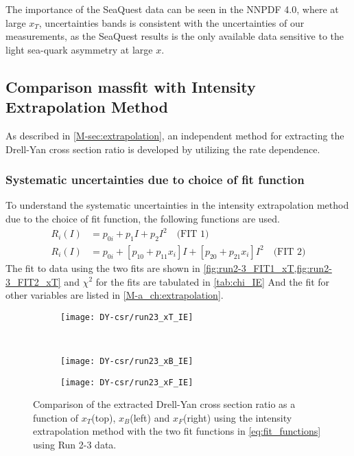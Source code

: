 \documentclass[../main.tex]{subfiles}
\begin{document}
The importance of the SeaQuest data can be seen in the NNPDF 4.0, where at large $x_T$,
uncertainties bands is consistent with the uncertainties of our measurements, as the SeaQuest
results is the only available data sensitive to the light sea-quark asymmetry at large $x$.


\subsection{Comparison massfit with Intensity Extrapolation Method}
As described in \cref{M-sec:extrapolation}, an independent method for extracting the Drell-Yan cross section
ratio is developed by utilizing the rate dependence. 

\subsubsection{Systematic uncertainties due to choice of fit function}
To understand the systematic uncertainties in the intensity extrapolation method due to the
choice of fit function, the following functions are used.
\begin{align}
	R_i\left(I\right) & = p_{0i} + p_{1} I + p_{2} I^2 \quad\text{(FIT 1)}                                                     \\
	R_i\left(I\right) & = p_{0i} + \left[p_{10} + p_{11}x_i\right] I + \left[p_{20} + p_{21}x_i\right]I^2 \quad \text{(FIT 2)}
	\label{eq:fit_functions}
\end{align}
The fit to data using the two fits are shown in \cref{fig:run2-3_FIT1_xT,fig:run2-3_FIT2_xT}
and $\chi^2$ for the fits are tabulated in \cref{tab:chi_IE}
And the fit for other variables are listed in \cref{M-a_ch:extrapolation}.



\begin{figure}[h!]
	\centering
	\begin{subfigure}{0.6\linewidth}
		\texttt{[image: DY-csr/run23\_xT\_IE]}
	\end{subfigure}\\
	\begin{subfigure}{0.45\linewidth}
		\texttt{[image: DY-csr/run23\_xB\_IE]}
	\end{subfigure}
	\begin{subfigure}{0.45\linewidth}
		\texttt{[image: DY-csr/run23\_xF\_IE]}
	\end{subfigure}
	\caption{Comparison of the extracted Drell-Yan cross section ratio as a function of $x_T$(top),
		$x_B$(left) and $x_F$(right) using the intensity extrapolation method with the two fit functions in \cref{eq:fit_functions}
		using Run 2-3 data.}
	\label{fig:CSR_IE_run23}
\end{figure}
\end{document}
